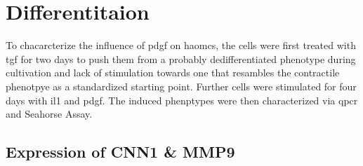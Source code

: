 \section{Differentitaion}
\label{sec:differentiation}
To chacarcterize the influence of \ac{pdgf} on \acp{haomc}, the cells were first treated with \ac{tgf} for two days to push them from a probably dedifferentiated phenotype during cultivation and lack of stimulation towards one that resambles the contractile phenotpye as a standardized starting point. Further cells were stimulated for four days with \ac{il1} and \ac{pdgf}. The induced phenptypes were then characterized via \ac{qpcr} and Seahorse Assay.

    \subsection{Expression of CNN1 \& MMP9}
    \label{subsec:qPCR}
